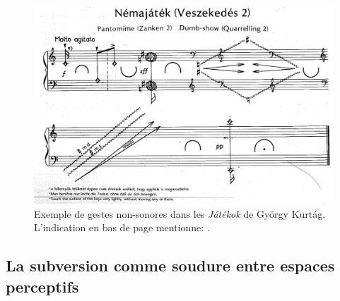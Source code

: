 \begin{figure}[!htbp]
	\captionsetup{format=plain}%
	\includegraphics[width=\linewidth]{gfx/03_gesture/Kurtag-Jatekok.png}
	\caption[Exemple de gestes non-sonores dans les \textit{Játékok} de György Kurtág]{Exemple de gestes non-sonores dans les \textit{Játékok} de György Kurtág. L'indication en bas de page mentionne: .}
	\label{fig:gesture:Kurtag-Jatekok}
\end{figure}


\subsection{La subversion comme soudure entre espaces perceptifs}

